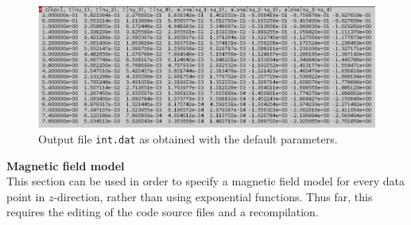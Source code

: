 \documentclass[11pt,twocolumn,a4paper]{article}
\begin{document}
\begin{figure}
  \centering
  \includegraphics[width=1.0\textwidth]{int}
  \caption{Output file {\tt int.dat} as obtained with the default parameters.}
\label{fig:int}
\end{figure}
{\bf Magnetic field model}\\
This section can be used in order to specify a magnetic field model for every data point in $z$-direction, rather than using exponential functions. Thus far, this requires the editing of the code source files and a recompilation.
\end{document}

